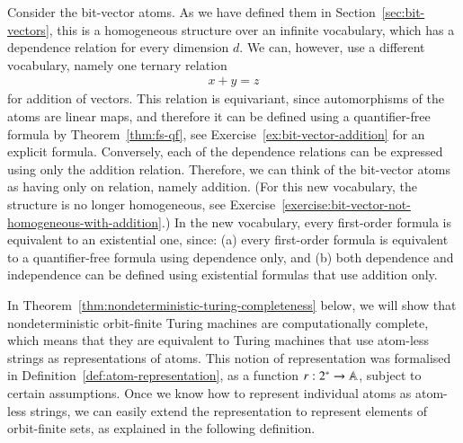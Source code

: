 \begin{myexample}\label{ex:bit-vector-addition-relation}
	Consider the bit-vector atoms. As we have defined them in Section~\ref{sec:bit-vectors}, this is a homogeneous structure over an infinite vocabulary, which has a dependence relation for every dimension $d$. We can, however, use a different vocabulary, namely one ternary relation  
	\begin{align*}
	x + y  = z
	\end{align*}
	for addition of vectors. This relation is equivariant, since automorphisms of the atoms are linear maps, and therefore it can be defined using a quantifier-free formula by Theorem~\ref{thm:fs-qf}, see Exercise~\ref{ex:bit-vector-addition} for an explicit formula. Conversely, each of the dependence relations can be expressed using  only the addition relation. Therefore, we can think of the bit-vector atoms as having only on relation, namely addition. (For this new vocabulary, the structure is no longer homogeneous, see Exercise~\ref{exercise:bit-vector-not-homogeneous-with-addition}.) In the new vocabulary, every first-order formula is equivalent to an existential one, since: (a) every first-order formula is equivalent to a  quantifier-free formula using dependence only, and (b) both dependence and independence can be defined using existential formulas that use addition only. 
\end{myexample}




In Theorem~\ref{thm:nondeterministic-turing-completeness} below, we will show that nondeterministic orbit-finite Turing machines are computationally complete, which means that they are equivalent to Turing machines that use atom-less strings as representations of atoms. This notion of representation was formalised in  Definition~\ref{def:atom-representation}, as a function $r : 2^* \to \mathbb A$, subject to certain assumptions. Once we know how to represent individual atoms as atom-less strings, we can easily extend the representation to   represent  elements of  orbit-finite sets, as explained in the following definition.

